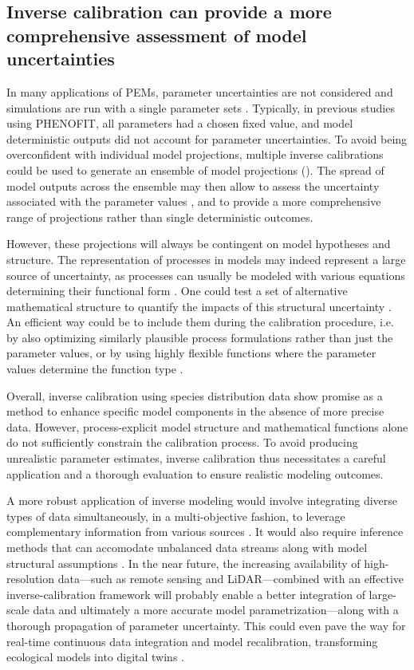 \documentclass[preprint,12pt,authoryear]{elsarticle}
\begin{document}
{\subsection{Inverse calibration can provide a more comprehensive assessment of model uncertainties}

In many applications of PEMs, parameter uncertainties are not considered and simulations are run with a single parameter sets \citep{Niu2014, Lobell2010}. Typically, in previous studies using PHENOFIT, all parameters had a chosen fixed value, and model deterministic outputs did not account for parameter uncertainties. To avoid being overconfident with individual model projections, multiple inverse calibrations could be used to generate an ensemble of model projections (). The spread of model outputs across the ensemble may then allow to assess the uncertainty associated with the parameter values \citep{Simmonds2024}, and to provide a more comprehensive range of projections rather than single deterministic outcomes.

However, these projections will always be contingent on model hypotheses and structure. The representation of processes in models may indeed represent a large source of uncertainty, as processes can usually be modeled with various equations determining their functional form \citep{Keenan2011}. One could test a set of alternative mathematical structure to quantify the impacts of this structural uncertainty \citep{Huber2020}. An efficient way could be to include them during the calibration procedure, i.e. by also optimizing similarly plausible process formulations rather than just the parameter values, or by using highly flexible functions where the parameter values determine the function type \citep{Chuine2000}.

Overall, inverse calibration using species distribution data show promise as a method to enhance specific model components in the absence of more precise data. However, process-explicit model structure and mathematical functions alone do not sufficiently constrain the calibration process. To avoid producing unrealistic parameter estimates, inverse calibration thus necessitates a careful application and a thorough evaluation to ensure realistic modeling outcomes. 

A more robust application of inverse modeling would involve integrating diverse types of data simultaneously, in a multi-objective fashion, to leverage complementary information from various sources \citep{Cameron2022}. \textcolor{customred}{It would also require inference methods that can accomodate unbalanced data streams along with model structural assumptions \citep{Oberpriller2021}}. In the near future, the increasing availability of high-resolution data---such as remote sensing and LiDAR---combined with an effective inverse-calibration framework will probably enable a better integration of large-scale data and ultimately a more accurate model parametrization\textcolor{customred}{---along with a thorough propagation of parameter uncertainty.} This could even pave the way for real-time continuous data integration and model recalibration, transforming ecological models into digital twins \citep{Koning2023}.

}
\end{document}
